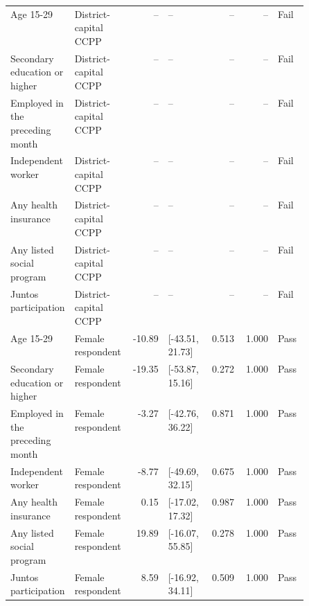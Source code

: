 \begin{longtable}{@{}p{0.20\linewidth}p{0.16\linewidth}rp{0.14\linewidth}rrl@{}}
Age 15-29 & District-capital CCPP & -- & -- & -- & -- & Fail \\
Secondary education or higher & District-capital CCPP & -- & -- & -- & -- & Fail \\
Employed in the preceding month & District-capital CCPP & -- & -- & -- & -- & Fail \\
Independent worker & District-capital CCPP & -- & -- & -- & -- & Fail \\
Any health insurance & District-capital CCPP & -- & -- & -- & -- & Fail \\
Any listed social program & District-capital CCPP & -- & -- & -- & -- & Fail \\
Juntos participation & District-capital CCPP & -- & -- & -- & -- & Fail \\
Age 15-29 & Female respondent & -10.89 & [-43.51, 21.73] & 0.513 & 1.000 & Pass \\
Secondary education or higher & Female respondent & -19.35 & [-53.87, 15.16] & 0.272 & 1.000 & Pass \\
Employed in the preceding month & Female respondent & -3.27 & [-42.76, 36.22] & 0.871 & 1.000 & Pass \\
Independent worker & Female respondent & -8.77 & [-49.69, 32.15] & 0.675 & 1.000 & Pass \\
Any health insurance & Female respondent & 0.15 & [-17.02, 17.32] & 0.987 & 1.000 & Pass \\
Any listed social program & Female respondent & 19.89 & [-16.07, 55.85] & 0.278 & 1.000 & Pass \\
Juntos participation & Female respondent & 8.59 & [-16.92, 34.11] & 0.509 & 1.000 & Pass \\
\end{longtable}
\endgroup
